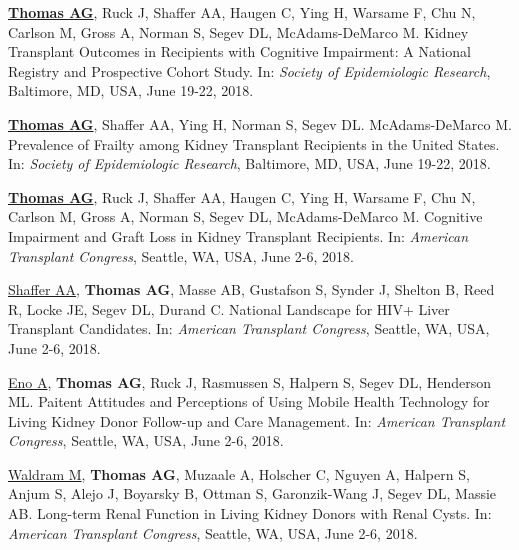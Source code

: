 \documentclass[10pt]{article}
\makeatletter
\newlength{\bibhang}
\newlength{\bibsep}
 {\@listi \global\bibsep\itemsep \global\advance\bibsep by\parsep}
\newenvironment{bibenum*}
  {\renewcommand\labelenumi{[\theenumi]}%
   \etaremune[
     topsep=0pt,
     itemsep=\bibsep,
     parsep=0pt,partopsep=0pt,
     itemindent=-\bibhang,
     leftmargin={\bibhang+\widthof{[999]}}]}
  {\endetaremune}
\makeatother
\begin{document}
\begin{bibenum*}


\item \underline{\textbf{Thomas AG}}, Ruck J, Shaffer AA, Haugen C,
  Ying H, Warsame F, Chu N, Carlson M, Gross A, Norman S, Segev DL,
  McAdams-DeMarco M.
  Kidney Transplant Outcomes in Recipients with Cognitive Impairment:
  A National Registry and Prospective Cohort Study.
  In: \emph{Society of Epidemiologic Research},
  Baltimore, MD, USA, June 19-22, 2018.

\item \underline{\textbf{Thomas AG}}, Shaffer AA, Ying H, Norman S,
  Segev DL. McAdams-DeMarco M.
  Prevalence of Frailty among Kidney Transplant Recipients in the United States.
  In: \emph{Society of Epidemiologic Research},
  Baltimore, MD, USA, June 19-22, 2018.

\item \underline{\textbf{Thomas AG}}, Ruck J, Shaffer AA, Haugen C,
  Ying H, Warsame F, Chu N, Carlson M, Gross A, Norman S, Segev DL,
  McAdams-DeMarco M.
  Cognitive Impairment and Graft Loss in Kidney Transplant Recipients.
  In: \emph{American Transplant Congress},
  Seattle, WA, USA, June 2-6, 2018.

\item \underline{Shaffer AA}, \textbf{Thomas AG}, Masse AB, Gustafson S,
  Synder J, Shelton B, Reed R, Locke JE, Segev DL, Durand C.
  National Landscape for HIV+ Liver Transplant Candidates.
  In: \emph{American Transplant Congress},
  Seattle, WA, USA, June 2-6, 2018.

\item \underline{Eno A}, \textbf{Thomas AG}, Ruck J, Rasmussen S,
  Halpern S, Segev DL, Henderson ML.
  Paitent Attitudes and Perceptions of Using Mobile Health Technology
  for Living Kidney Donor Follow-up and Care Management.
  In: \emph{American Transplant Congress},
  Seattle, WA, USA, June 2-6, 2018.

\item \underline{Waldram M}, \textbf{Thomas AG}, Muzaale A, Holscher C,
  Nguyen A, Halpern S, Anjum S, Alejo J, Boyarsky B, Ottman S,
  Garonzik-Wang J, Segev DL, Massie AB.
  Long-term Renal Function in Living Kidney Donors with Renal Cysts.
  In: \emph{American Transplant Congress},
  Seattle, WA, USA, June 2-6, 2018.


\end{bibenum*}
\end{document}
